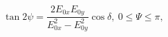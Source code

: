 \documentclass{article}
\begin{document}
\begin{equation}
    \tan 2\psi = \frac{2E_{0x}E_{0y}}{E_{0x}^2 - E_{0y}^2}\cos \delta,\: 0 \leqslant \Psi \leqslant \pi,
\end{equation}
\end{document}
